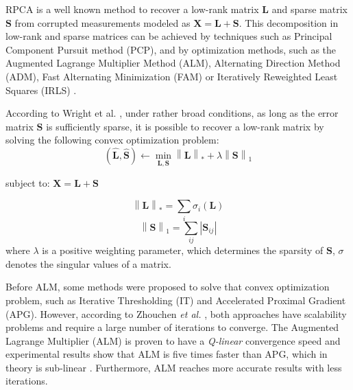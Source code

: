 RPCA is a well known method to recover a low-rank matrix $\pmb{L}$ and sparse matrix $\pmb{S}$ from corrupted measurements modeled as $\pmb{X} = \pmb{L} + \pmb{S}$. This decomposition in low-rank and sparse matrices can be achieved by techniques such as Principal Component Pursuit method (PCP), and by optimization methods, such as the Augmented Lagrange Multiplier Method (ALM), Alternating Direction Method (ADM), Fast Alternating Minimization (FAM) or Iteratively Reweighted Least Squares (IRLS) \cite{candes2011robust,vaswani2018robust,lerman2018overview}.

According to Wright et al. \cite{wright2009robust}, under rather broad conditions, as long as the error matrix $\pmb{S}$ is sufficiently sparse, it is possible to recover a low-rank matrix by solving the following convex optimization problem:
\begin{equation}\label{eq:4.01}
	(\hat{\pmb{L}}, \hat{\pmb{S}})\leftarrow \min_{\pmb{L},\pmb{S}}\left \| \pmb{L} \right \|_{*} + \lambda \left \| \pmb{S} \right \|_{1}
\end{equation}
\begin{center} subject to: $\pmb{X} = \pmb{L} + \pmb{S}$ \end{center}
\begin{equation}\label{eq:4.02}
    \left \| \pmb{L} \right \|_{*} = \sum_{i} \sigma_{i}(\pmb{L})
\end{equation}
\begin{equation}\label{eq:4.03}
    \left \| \pmb{S} \right \|_{1} = \sum_{ij} \left | \pmb{S}_{ij} \right |
\end{equation}
where $\lambda$ is a positive weighting parameter, which determines the sparsity of $\pmb{S}$, $\sigma$ denotes the singular values of a matrix. 

Before ALM, some methods were proposed to solve that convex optimization problem, such as Iterative Thresholding (IT) and Accelerated Proximal Gradient (APG). However, according to Zhouchen \emph{et al.} \cite{lin2010augmented}, both approaches have scalability problems and require a large number of iterations to converge. The Augmented Lagrange Multiplier (ALM) is proven to have a \emph{Q-linear} convergence speed and experimental results show that ALM is five times faster than APG, which in theory is sub-linear \cite{lin2010augmented}. Furthermore, ALM reaches more accurate results with less iterations.

